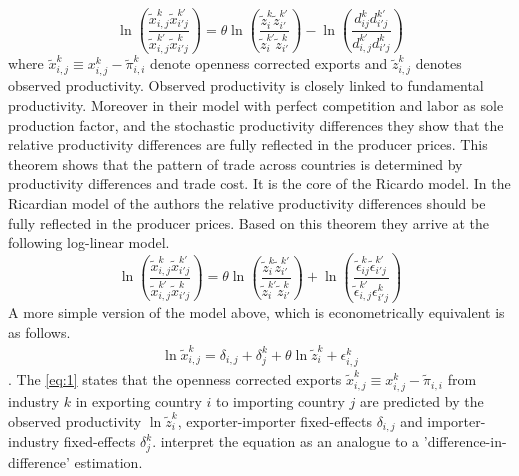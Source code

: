 \[ \ln \left( \frac{\tilde{x}_{i,j}^k \tilde{x}^{k'}_{i'j}}{\tilde{x}_{i,j}^{k'} \tilde{x}^{k}_{i'j}} \right)= \theta \ln \left( \frac{\tilde{z}_{i}^k \tilde{z}^{k'}_{i'}}{\tilde{z}_{i}^{k'} \tilde{z}^{k}_{i'}} \right)-\ln \left( \frac{ d_{ij}^k d^{k'}_{i'j}}{d_{i,j}^{k'} {d}^{k}_{i'j}} \right) \]
where $\tilde{x}_{i,j}^k \equiv x_{i,j}^k -  \tilde{\pi}^k_{i,i} $ denote openness corrected exports and $\tilde{z}_{i,j}^k$ denotes observed productivity. 
Observed productivity is closely linked to fundamental productivity. %
Moreover in their model  with perfect competition and labor as sole production factor, and the stochastic productivity differences they show that the relative productivity differences are fully reflected in the producer prices. 
This theorem shows that the pattern of trade across countries is determined by productivity differences and trade cost. It is the core of the Ricardo model.
 In the Ricardian model of the authors the relative productivity differences should be fully reflected in the producer prices. 
Based on this theorem they arrive at the following log-linear model.
\[ \ln \left( \frac{\tilde{x}_{i,j}^k \tilde{x}^{k'}_{i'j}}{\tilde{x}_{i,j}^{k'} \tilde{x}^{k}_{i'j}} \right)= \theta \ln \left( \frac{\tilde{z}_{i}^k \tilde{z}^{k'}_{i'}}{\tilde{z}_{i}^{k'} \tilde{z}^{k}_{i'}} \right)+\ln \left( \frac{ \tilde{\epsilon}_{ij}^k \tilde{\epsilon}^{k'}_{i'j}}{\tilde{\epsilon}_{i,j}^{k'} {\epsilon}^{k}_{i'j}} \right) \]
A more simple version of the model above, which is econometrically equivalent is as follows.
  \begin{align} 
  \label{eq:1} \ln \tilde{x}_{i,j}^k=\delta_{i,j}+\delta_j^k + \theta \ln\tilde{z}_i^k
+\epsilon^k_{i,j}
 \end{align}  . 
The \cref{eq:1} states that the openness corrected exports  $\tilde{x}_{i,j}^k \equiv x_{i,j}^k -  \tilde{\pi}_{i,i} $ from industry $k$ in exporting country $i$ to importing country $j$ are predicted by the observed productivity $\ln\tilde{z}_i^k$,  exporter-importer fixed-effects $\delta_{i,j}$ and importer-industry fixed-effects $\delta_j^k$. \textcite{costinot} interpret the equation as an analogue to a 'difference-in-difference' estimation. 
